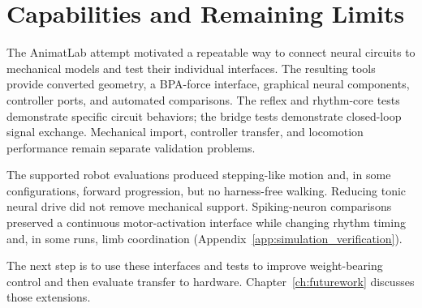 \section{Capabilities and Remaining Limits}\label{sec:sns_discussion}

The AnimatLab attempt motivated a repeatable way to connect neural circuits to mechanical models and test their individual interfaces. The resulting tools provide converted geometry, a BPA-force interface, graphical neural components, controller ports, and automated comparisons. The reflex and rhythm-core tests demonstrate specific circuit behaviors; the bridge tests demonstrate closed-loop signal exchange. Mechanical import, controller transfer, and locomotion performance remain separate validation problems.

The supported robot evaluations produced stepping-like motion and, in some configurations, forward progression, but no harness-free walking. Reducing tonic neural drive did not remove mechanical support. Spiking-neuron comparisons preserved a continuous motor-activation interface while changing rhythm timing and, in some runs, limb coordination (Appendix~\ref{app:simulation_verification}).

The next step is to use these interfaces and tests to improve weight-bearing control and then evaluate transfer to hardware. Chapter~\ref{ch:futurework} discusses those extensions. 
